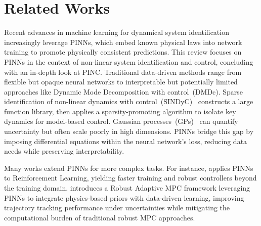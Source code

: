 \documentclass[conference]{IEEEtran}
\begin{document}

\section{Related Works} %
\label{sec:related}
Recent advances in machine learning for dynamical system identification increasingly leverage PINNs, which embed known physical laws into network training to promote physically consistent predictions. This review focuses on PINNs in the context of non-linear system identification and control, concluding with an in-depth look at PINC. Traditional data-driven methods range from flexible but opaque neural networks to interpretable but potentially limited approaches like Dynamic Mode Decomposition with control~(DMDc). Sparse identification of non-linear dynamics with control~(SINDyC)~\cite{brunton_data-driven_2021} constructs a large function library, then applies a sparsity-promoting algorithm to isolate key dynamics for model-based control. Gaussian processes~(GPs)~\cite{rasmussen_gaussian_2008,amer2025} can quantify uncertainty but often scale poorly in high dimensions. PINNs bridge this gap by imposing differential equations within the neural network’s loss, reducing data needs while preserving interpretability.

Many works extend PINNs for more complex tasks. For instance, \cite{faria_data-driven_2024} applies PINNs to Reinforcement Learning, yielding faster training and robust controllers beyond the training domain. \cite{ramp} introduces a Robust Adaptive MPC framework leveraging PINNs to integrate physics-based priors with data-driven learning, improving trajectory tracking performance under uncertainties while mitigating the computational burden of traditional robust MPC approaches.
\end{document}
